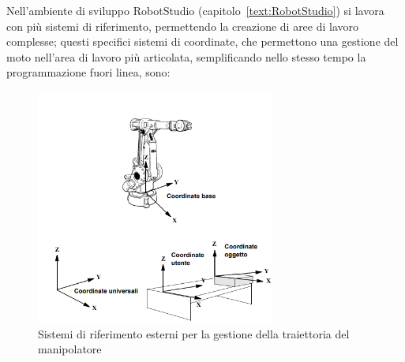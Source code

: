 Nell'ambiente di sviluppo RobotStudio (capitolo~\vref{text:RobotStudio}) si lavora con più sistemi di riferimento, permettendo la creazione di aree di lavoro complesse; questi specifici sistemi di coordinate, che permettono una gestione del moto nell'area di lavoro più articolata, semplificando nello stesso tempo la programmazione fuori linea, sono:
\begin{figure}[h]
	\centering
	\includegraphics[width=0.7\textwidth]{Immagini/SistemiDiCoordinate}
	\caption{Sistemi di riferimento esterni per la gestione della traiettoria del manipolatore}
	\label{fig:SdR}
\end{figure}
